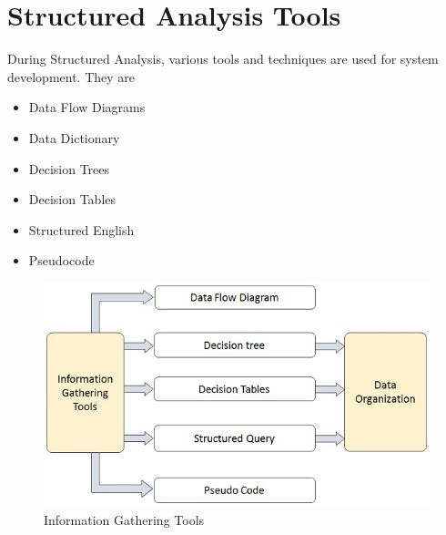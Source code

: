 \documentclass[a4paper,12pt]{report}
\begin{document}
\section{Structured Analysis Tools}
During Structured Analysis, various tools and techniques are used for system development. They are \\
\begin{itemize}
	\item   Data Flow Diagrams
	\item	Data Dictionary
	\item	Decision Trees
	\item	Decision Tables
	\item	Structured English
	\item	Pseudocode
\end{itemize}
\begin{figure}[h]
	\centering
	\includegraphics[width=0.7\linewidth]{6_fig1}
	\caption{Information Gathering Tools}
	\label{fig:6fig1}
\end{figure}
\end{document}
